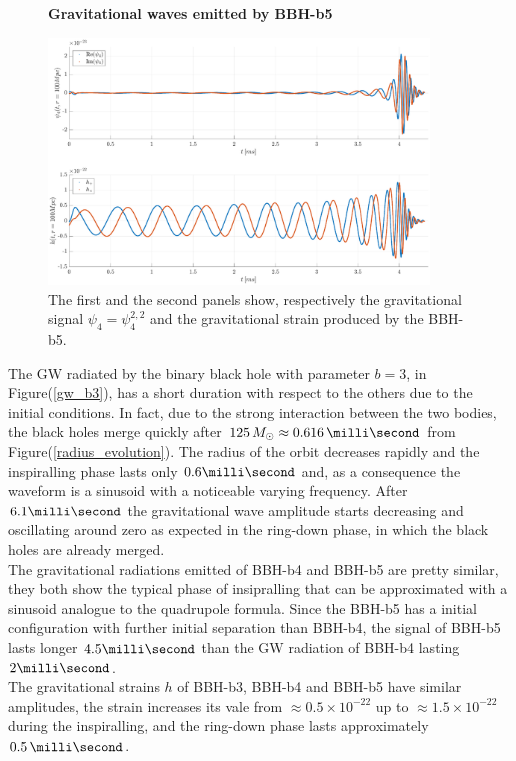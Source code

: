    \begin{figure}[h!]
\centering
    \textbf{Gravitational waves emitted by BBH-b5}\par\medskip
\centering
\includegraphics[width=0.9\textwidth]{numerical_evolution/gw_b5.eps}
   \caption{The first and the second panels show, respectively the gravitational signal $\psi_4=\psi_4 ^{2,2}$ and the gravitational strain produced by the BBH-b5.}
\label{gw_b5}
\end{figure}
The GW radiated by the binary black hole with parameter $b=3$, in Figure(\ref{gw_b3}), has a short duration with respect to the others due to the initial conditions.
In fact, due to the strong interaction between the two bodies, the black holes merge quickly after $125 \, M_{\odot} \approx 0.616 \, \milli \second$ from Figure(\ref{radius_evolution}). 
The radius of the orbit decreases rapidly and the inspiralling phase lasts only $0.6 \milli \second$ and, as a consequence the waveform is a sinusoid with a noticeable varying frequency.
After $6.1 \milli \second$ the gravitational wave amplitude starts decreasing and oscillating around zero as expected in the ring-down phase, in which the black holes are already merged. 
\\
The gravitational radiations emitted of BBH-b4 and BBH-b5 are pretty similar, they both show the typical phase of insipralling that can be approximated with a sinusoid analogue to the quadrupole formula.
Since the BBH-b5 has a initial configuration with further initial separation than BBH-b4, the signal of BBH-b5 lasts longer $4.5 \milli \second$ than the GW radiation of BBH-b4 lasting $2 \milli \second$.\\
The gravitational strains $h$ of BBH-b3, BBH-b4 and BBH-b5 have similar amplitudes, the strain increases its vale from $\approx 0.5 \times 10^{-22}$ up to $\approx1.5 \times 10^{-22}$ during the inspiralling, and the ring-down phase lasts approximately $0.5 \, \milli \second$.\\
